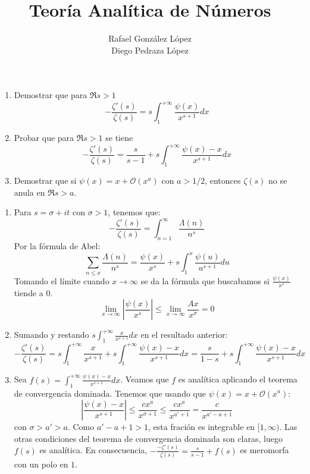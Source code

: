 \documentclass[twoside]{article}
\begin{document}
\title{Teoría Analítica de Números}
\author{Rafael González López\\Diego Pedraza López}
\maketitle

\begin{ejercicio}{1}
\begin{enumerate}
	\item Demostrar que para $\Re s > 1$
	\[ -\frac{ζ'(s)}{ζ(s)} = s \int_1^{+∞} \frac{ψ(x)}{x^{s+1}} dx \]
	\item Probar que para $\Re s > 1$ se tiene
	\[ -\frac{ζ'(s)}{ζ(s)} = \frac{s}{s-1} + s \int_1^{+∞} \frac{ψ(x)-x}{x^{s+1}}dx \]
	\item Demostrar que si $ψ(x) = x + \mathcal{O}(x^a)$ con $a > 1/2$, entonces $ζ(s)$ no se anula en $\Re s > a$.
\end{enumerate}
\end{ejercicio}
\begin{solucion}
\begin{enumerate}
	\item Para $s=σ+it$ con $σ>1$, tenemos que:
\[ - \frac{ζ'(s)}{ζ(s)} = \int_{n=1}^{∞} \frac{Λ(n)}{n^s} \]
Por la fórmula de Abel:
\[ \sum_{n≤x} \frac{Λ(n)}{n^s} = \frac{ψ(x)}{x^s} + s \int_1^{x} \frac{ψ(u)}{u^{s+1}} du \]
Tomando el límite cuando $x\to∞$ se da la fórmula que buscabamos si $\frac{ψ(x)}{x^s}$ tiende a $0$.
\[ \lim_{x \to ∞} \left|\frac{ψ(x)}{x^s}\right| ≤ \lim_{x \to ∞} \frac{Ax}{x^σ} = 0\]
	\item Sumando y restando $s\int_1^{+∞} \frac{x}{x^{s+1}}dx$ en el resultado anterior:
	\[ -\frac{ζ'(s)}{ζ(s)} = s\int_1^{+∞} \frac{x}{x^{s+1}} + s \int_1^{+∞} \frac{ψ(x)-x}{x^{s+1}} dx = \frac{s}{1-s} + s \int_1^{+∞} \frac{ψ(x)-x}{x^{s+1}} dx \]
	\item Sea $f(s) = \int_1^{+∞} \frac{ψ(x)-x}{x^{s+1}} dx$. Veamos que $f$ es analítica aplicando el teorema de convergencia dominada. Tenemos que usando que $ψ(x) = x+\mathcal{O}(x^a)$:
	\[ \left|\frac{ψ(x)-x}{x^{s+1}}\right| ≤ \frac{cx^a}{x^{σ+1}} ≤ \frac{cx^a}{x^{a'+1}} = \frac{c}{x^{a'-a+1}} \]
	con $σ > a' > a$. Como $a'-a+1 > 1$, esta fración es integrable en $[1,∞)$. Las otras condiciones del teorema de convergencia dominada son claras, luego $f(s)$ es analítica. En consecuencia, $-\frac{-ζ'(s)}{ζ(s)} = \frac{s}{s-1}+f(s)$ es meromorfa con un polo en $1$.
\end{enumerate}
\end{solucion}
\end{document}
